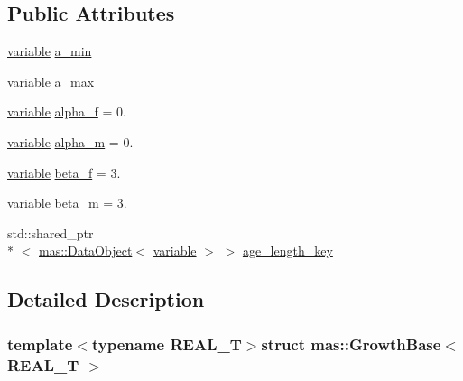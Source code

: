 \subsection*{Public Attributes}
\begin{DoxyCompactItemize}
\item 
\hyperlink{structmas_1_1_growth_base_a2b2f3559be1ce3134ab0a145fa3a8f43}{variable} \hyperlink{structmas_1_1_growth_base_aab84c98377a8d04e4dcaaa7e7e19d2e2}{a\-\_\-min}
\item 
\hyperlink{structmas_1_1_growth_base_a2b2f3559be1ce3134ab0a145fa3a8f43}{variable} \hyperlink{structmas_1_1_growth_base_af5003b2a605a0107482b9dd9d368ef2d}{a\-\_\-max}
\item 
\hyperlink{structmas_1_1_growth_base_a2b2f3559be1ce3134ab0a145fa3a8f43}{variable} \hyperlink{structmas_1_1_growth_base_a412552f9b7d23d1c1f056e826b8981ae}{alpha\-\_\-f} = 0.
\item 
\hyperlink{structmas_1_1_growth_base_a2b2f3559be1ce3134ab0a145fa3a8f43}{variable} \hyperlink{structmas_1_1_growth_base_a396354505138367e93a446571e934e9e}{alpha\-\_\-m} = 0.
\item 
\hyperlink{structmas_1_1_growth_base_a2b2f3559be1ce3134ab0a145fa3a8f43}{variable} \hyperlink{structmas_1_1_growth_base_ab24d4baacfb805e7b48db9b74e332658}{beta\-\_\-f} = 3.
\item 
\hyperlink{structmas_1_1_growth_base_a2b2f3559be1ce3134ab0a145fa3a8f43}{variable} \hyperlink{structmas_1_1_growth_base_a17b3c2eef24ac82f2feb94119eb4ae64}{beta\-\_\-m} = 3.
\item 
std\-::shared\-\_\-ptr\\*
$<$ \hyperlink{structmas_1_1_data_object}{mas\-::\-Data\-Object}$<$ \hyperlink{structmas_1_1_growth_base_a2b2f3559be1ce3134ab0a145fa3a8f43}{variable} $>$ $>$ \hyperlink{structmas_1_1_growth_base_a8b31d8d43f6ec3383d3be31a674f997a}{age\-\_\-length\-\_\-key}
\end{DoxyCompactItemize}


\subsection{Detailed Description}
\subsubsection*{template$<$typename R\-E\-A\-L\-\_\-\-T$>$struct mas\-::\-Growth\-Base$<$ R\-E\-A\-L\-\_\-\-T $>$}



